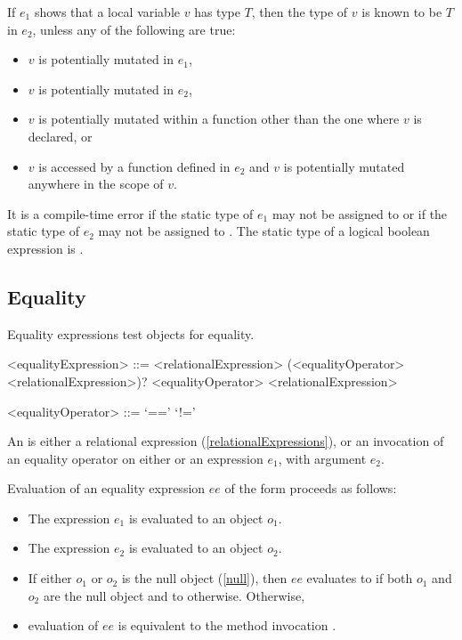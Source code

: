 \documentclass[makeidx]{article}
\begin{document}
{\LMHash{}%
If $e_1$ shows that a local variable $v$ has type $T$,
then the type of $v$ is known to be $T$ in $e_2$,
unless any of the following are true:
\begin{itemize}
\item $v$ is potentially mutated in $e_1$,
\item $v$ is potentially mutated in $e_2$,
\item $v$ is potentially mutated within a function other
  than the one where $v$ is declared, or
\item $v$ is accessed by a function defined in $e_2$ and
  $v$ is potentially mutated anywhere in the scope of $v$.
\end{itemize}

\LMHash{}%
It is a compile-time error if
the static type of $e_1$ may not be assigned to 
or if the static type of $e_2$ may not be assigned to .
The static type of a logical boolean expression is .


\subsection{Equality}

\LMHash{}%
Equality expressions test objects for equality.

\begin{grammar}
<equalityExpression> ::= \gnewline{}
  <relationalExpression> (<equalityOperator> <relationalExpression>)?
  \alt \SUPER{} <equalityOperator> <relationalExpression>

<equalityOperator> ::= `=='
  \alt `!='
\end{grammar}

\LMHash{}%
An  is either a relational expression
(\ref{relationalExpressions}),
or an invocation of an equality operator on either \SUPER{}
or an expression $e_1$, with argument $e_2$.

\LMHash{}%
Evaluation of an equality expression $ee$ of the form 
proceeds as follows:
\begin{itemize}
\item The expression $e_1$ is evaluated to an object $o_1$.
\item The expression $e_2$ is evaluated to an object $o_2$.
\item If either $o_1$ or $o_2$ is the null object (\ref{null}),
  then $ee$ evaluates to \TRUE{} if both $o_1$ and $o_2$ are the null object
  and to \FALSE{} otherwise.
Otherwise,
\item evaluation of $ee$ is equivalent to the method invocation
  .
\end{itemize}

}
\end{document}
